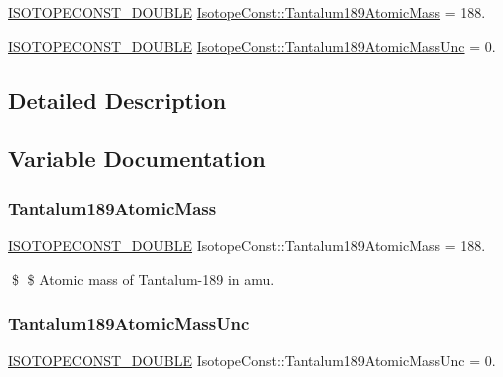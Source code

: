 \begin{DoxyCompactItemize}
\item 
\mbox{\hyperlink{group___isotope_const-_macros_ga8f45a7272ce02c0b4c65c44636ed719a}{I\+S\+O\+T\+O\+P\+E\+C\+O\+N\+S\+T\+\_\+\+D\+O\+U\+B\+LE}} \mbox{\hyperlink{group___isotope_const-_tantalum-_ta189_ga16fd0f6ff5321bc2f16002313136f820}{Isotope\+Const\+::\+Tantalum189\+Atomic\+Mass}} = 188.
\item 
\mbox{\hyperlink{group___isotope_const-_macros_ga8f45a7272ce02c0b4c65c44636ed719a}{I\+S\+O\+T\+O\+P\+E\+C\+O\+N\+S\+T\+\_\+\+D\+O\+U\+B\+LE}} \mbox{\hyperlink{group___isotope_const-_tantalum-_ta189_gaedaf7d1acda817e08c2365652a90e034}{Isotope\+Const\+::\+Tantalum189\+Atomic\+Mass\+Unc}} = 0.
\end{DoxyCompactItemize}


\subsection{Detailed Description}


\subsection{Variable Documentation}
\mbox{\label{group___isotope_const-_tantalum-_ta189_ga16fd0f6ff5321bc2f16002313136f820}} 
\subsubsection{\texorpdfstring{Tantalum189\+Atomic\+Mass}{Tantalum189AtomicMass}}
{\footnotesize\ttfamily \mbox{\hyperlink{group___isotope_const-_macros_ga8f45a7272ce02c0b4c65c44636ed719a}{I\+S\+O\+T\+O\+P\+E\+C\+O\+N\+S\+T\+\_\+\+D\+O\+U\+B\+LE}} Isotope\+Const\+::\+Tantalum189\+Atomic\+Mass = 188.}

\$ \$ Atomic mass of Tantalum-\/189 in amu. \mbox{\label{group___isotope_const-_tantalum-_ta189_gaedaf7d1acda817e08c2365652a90e034}} 
\subsubsection{\texorpdfstring{Tantalum189\+Atomic\+Mass\+Unc}{Tantalum189AtomicMassUnc}}
{\footnotesize\ttfamily \mbox{\hyperlink{group___isotope_const-_macros_ga8f45a7272ce02c0b4c65c44636ed719a}{I\+S\+O\+T\+O\+P\+E\+C\+O\+N\+S\+T\+\_\+\+D\+O\+U\+B\+LE}} Isotope\+Const\+::\+Tantalum189\+Atomic\+Mass\+Unc = 0.}


